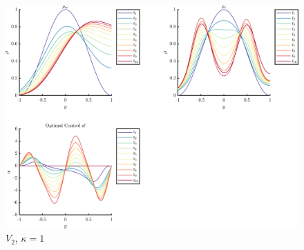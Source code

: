 \documentclass[11pt, a4paper]{article}
\theoremstyle{definition}
\begin{document}
\begin{figure}[h]
	\centering
	\includegraphics[scale=0.055]{V2p1.png}
	\caption{$V_{2}$, $\kappa = 1$} 
	\label{F3a}
\end{figure}
\end{document}
